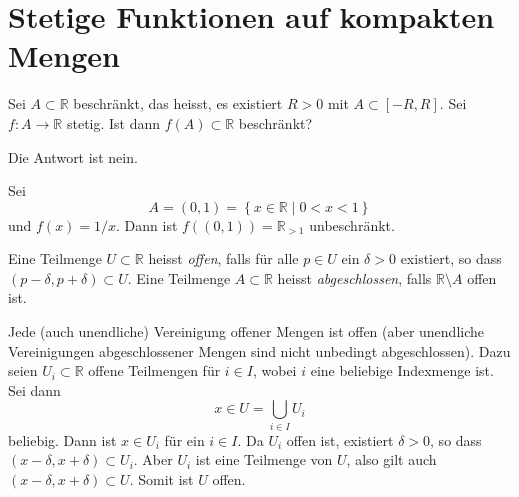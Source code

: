 \documentclass[../main.tex]{subfiles}
\begin{document}
\section{Stetige Funktionen auf kompakten Mengen}

\begin{question}
Sei $A \subset \mathbb{R}$ beschränkt,
das heisst, es existiert $R > 0$ 
mit $A \subset [-R, R]$.
Sei $f \colon A \to \mathbb{R}$ stetig.
Ist dann $f(A) \subset \mathbb{R}$ beschränkt?
\end{question}

Die Antwort ist nein.
\begin{example}
  Sei 
  \[
    A = (0, 1) = \left\{x \in \mathbb{R} \mid 0 < x < 1\right\}
  \]
  und $f(x) = 1/x$. Dann ist $f((0, 1)) = \mathbb{R}_{>1}$ 
  unbeschränkt.
\end{example}

\begin{definition}
  Eine Teilmenge
  $U \subset \mathbb{R}$ 
  heisst \emph{offen},
  falls für
  alle $p \in U$ ein
  $\delta > 0$ existiert,
  so dass $(p - \delta, p + \delta)
  \subset U$.
Eine Teilmenge
  $A \subset \mathbb{R}$ 
  heisst  \emph{abgeschlossen},
  falls $\mathbb{R} \setminus A$ 
  offen ist.
\end{definition}

\begin{remark}
  Jede (auch unendliche) Vereinigung offener Mengen ist offen
  (aber unendliche Vereinigungen abgeschlossener Mengen
  sind nicht unbedingt abgeschlossen).
  Dazu seien $U_i \subset \mathbb{R}$ offene Teilmengen
  für $i \in I$, wobei $i$ eine 
  beliebige Indexmenge ist. Sei dann
  \[
    x \in U = \bigcup_{i \in I} U_i
  \]
  beliebig. Dann ist $x \in U_i$ für
  ein $i \in I$. Da $U_i$ offen ist, existiert
  $\delta > 0$, so dass $(x - \delta, x + \delta) \subset U_i$.
  Aber $U_i$ ist eine Teilmenge von $U$, also
  gilt auch $(x - \delta, x + \delta) \subset U$. Somit ist
  $U$ offen.
\end{remark}
\end{document}
